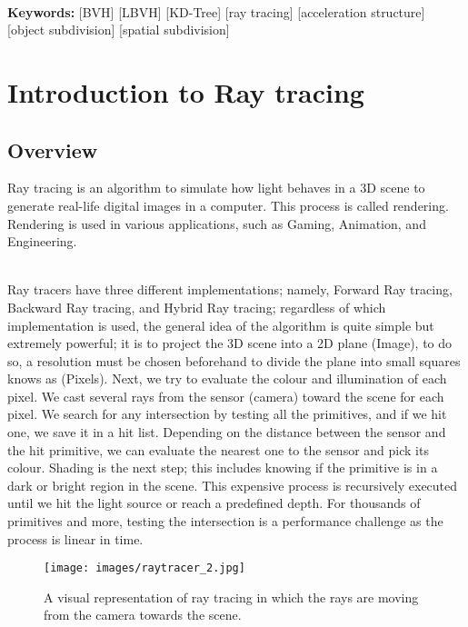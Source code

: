 \documentclass[11pt,a4paper]{article}
\begin{document}
\noindent
\\
\textbf{Keywords:} [BVH] [LBVH] [KD-Tree] [ray tracing] [acceleration structure]  [object subdivision] [spatial
subdivision] 
\clearpage
\tableofcontents
\clearpage



\section{Introduction to Ray tracing}
\subsection{Overview}
Ray tracing is an algorithm to simulate how light behaves in a 3D scene to generate real-life digital images in a computer. This process is called rendering. Rendering is used in various applications, such as Gaming, Animation, and Engineering.

\noindent
\\
Ray tracers have three different implementations; namely, Forward Ray tracing, Backward Ray tracing, and Hybrid Ray tracing; regardless of which implementation is used, the general idea of the algorithm is quite simple but extremely powerful; it is to project the 3D scene into a 2D plane (Image), to do so, a resolution must be chosen beforehand to divide the plane into small squares knows as (Pixels). Next, we try to evaluate the colour and illumination of each pixel. We cast several rays from the sensor (camera) toward the scene for each pixel. We search for any intersection by testing all the primitives, and if we hit one, we save it in a hit list. Depending on the distance between the sensor and the hit primitive, we can evaluate the nearest one to the sensor and pick its colour. Shading is the next step; this includes knowing if the primitive is in a dark or bright region in the scene. This expensive process is recursively executed until we hit the light source or reach a predefined depth. For thousands of primitives and more, testing the intersection is a performance challenge as the process is linear in time.

\begin{figure}[h]	
     \centering
     \captionsetup{justification=centering,margin=2cm}
     \texttt{[image: images/raytracer\_2.jpg]}
     \caption{A visual representation of ray tracing in which the rays are moving from the camera towards the scene. \protect\cite{Kimathi2020}}
     \label{fig:raytracer}
\end{figure}
\end{document}
